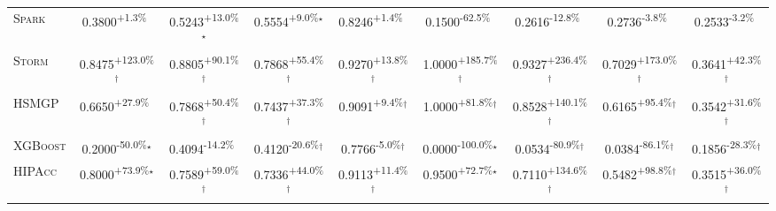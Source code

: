 \begin{table}[htbp]
\begin{tabular}{l|cccc|cccc}
\textsc{Spark} & \cellcolor{green!30}0.3800\textsuperscript{+1.3\%}$^{\,\,\,}$ & \cellcolor{green!30}0.5243\textsuperscript{+13.0\%}$^\star$ & \cellcolor{green!30}0.5554\textsuperscript{+9.0\%}$^\star$ & \cellcolor{green!30}0.8246\textsuperscript{+1.4\%}$^{\,\,\,}$ & \cellcolor{red!30}0.1500\textsuperscript{-62.5\%}$^{\,\,\,}$ & \cellcolor{red!30}0.2616\textsuperscript{-12.8\%}$^{\,\,\,}$ & \cellcolor{red!30}0.2736\textsuperscript{-3.8\%}$^{\,\,\,}$ & \cellcolor{red!30}0.2533\textsuperscript{-3.2\%}$^{\,\,\,}$ \\
\textsc{Storm} & \cellcolor{green!30}0.8475\textsuperscript{+123.0\%}$^\dagger$ & \cellcolor{green!30}0.8805\textsuperscript{+90.1\%}$^\dagger$ & \cellcolor{green!30}0.7868\textsuperscript{+55.4\%}$^\dagger$ & \cellcolor{green!30}0.9270\textsuperscript{+13.8\%}$^\dagger$ & \cellcolor{green!30}1.0000\textsuperscript{+185.7\%}$^\dagger$ & \cellcolor{green!30}0.9327\textsuperscript{+236.4\%}$^\dagger$ & \cellcolor{green!30}0.7029\textsuperscript{+173.0\%}$^\dagger$ & \cellcolor{green!30}0.3641\textsuperscript{+42.3\%}$^\dagger$ \\
\textsc{HSMGP} & \cellcolor{green!30}0.6650\textsuperscript{+27.9\%}$^{\,\,\,}$ & \cellcolor{green!30}0.7868\textsuperscript{+50.4\%}$^\dagger$ & \cellcolor{green!30}0.7437\textsuperscript{+37.3\%}$^\dagger$ & \cellcolor{green!30}0.9091\textsuperscript{+9.4\%}$^\dagger$ & \cellcolor{green!30}1.0000\textsuperscript{+81.8\%}$^\dagger$ & \cellcolor{green!30}0.8528\textsuperscript{+140.1\%}$^\dagger$ & \cellcolor{green!30}0.6165\textsuperscript{+95.4\%}$^\dagger$ & \cellcolor{green!30}0.3542\textsuperscript{+31.6\%}$^\dagger$ \\
\textsc{XGBoost} & \cellcolor{red!30}0.2000\textsuperscript{-50.0\%}$^\star$ & \cellcolor{red!30}0.4094\textsuperscript{-14.2\%}$^{\,\,\,}$ & \cellcolor{red!30}0.4120\textsuperscript{-20.6\%}$^\dagger$ & \cellcolor{red!30}0.7766\textsuperscript{-5.0\%}$^\dagger$ & \cellcolor{red!30}0.0000\textsuperscript{-100.0\%}$^\star$ & \cellcolor{red!30}0.0534\textsuperscript{-80.9\%}$^\dagger$ & \cellcolor{red!30}0.0384\textsuperscript{-86.1\%}$^\dagger$ & \cellcolor{red!30}0.1856\textsuperscript{-28.3\%}$^\dagger$ \\
\textsc{HIPAcc} & \cellcolor{green!30}0.8000\textsuperscript{+73.9\%}$^\star$ & \cellcolor{green!30}0.7589\textsuperscript{+59.0\%}$^\dagger$ & \cellcolor{green!30}0.7336\textsuperscript{+44.0\%}$^\dagger$ & \cellcolor{green!30}0.9113\textsuperscript{+11.4\%}$^\dagger$ & \cellcolor{green!30}0.9500\textsuperscript{+72.7\%}$^\star$ & \cellcolor{green!30}0.7110\textsuperscript{+134.6\%}$^\dagger$ & \cellcolor{green!30}0.5482\textsuperscript{+98.8\%}$^\dagger$ & \cellcolor{green!30}0.3515\textsuperscript{+36.0\%}$^\dagger$ \\

\end{tabular}
\end{table}
